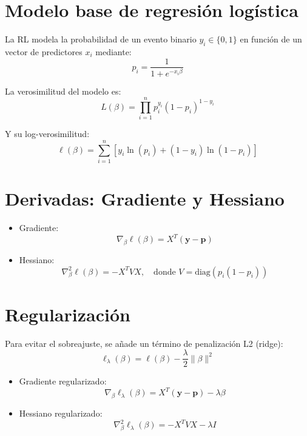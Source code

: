 \documentclass[12pt]{article}
\begin{document}
\section*{Modelo base de regresión logística}
La RL modela la probabilidad de un evento binario $y_i \in \{0,1\}$ en función de un vector de predictores $x_i$ mediante:
\begin{equation}
    p_i = \frac{1}{1 + e^{-x_i \beta}}
\end{equation}

La verosimilitud del modelo es:
\begin{equation}
    L(\beta) = \prod_{i=1}^n p_i^{y_i}(1 - p_i)^{1 - y_i}
\end{equation}

Y su log-verosimilitud:
\begin{equation}
    \ell(\beta) = \sum_{i=1}^{n} \left[ y_i \ln(p_i) + (1 - y_i) \ln(1 - p_i) \right]
\end{equation}

\section*{Derivadas: Gradiente y Hessiano}
\begin{itemize}
    \item Gradiente:
    \begin{equation}
        \nabla_{\beta} \ell(\beta) = X^T (\mathbf{y} - \mathbf{p})
    \end{equation}
    \item Hessiano:
    \begin{equation}
        \nabla^2_{\beta} \ell(\beta) = - X^T V X, \quad \text{donde } V = \text{diag}(p_i(1 - p_i))
    \end{equation}
\end{itemize}

\section*{Regularización}
Para evitar el sobreajuste, se añade un término de penalización L2 (ridge):
\begin{equation}
    \ell_{\lambda}(\beta) = \ell(\beta) - \frac{\lambda}{2} \|\beta\|^2
\end{equation}

\begin{itemize}
    \item Gradiente regularizado:
    \begin{equation}
        \nabla_{\beta} \ell_{\lambda}(\beta) = X^T (\mathbf{y} - \mathbf{p}) - \lambda \beta
    \end{equation}
    \item Hessiano regularizado:
    \begin{equation}
        \nabla^2_{\beta} \ell_{\lambda}(\beta) = - X^T V X - \lambda I
    \end{equation}
\end{itemize}
\end{document}

